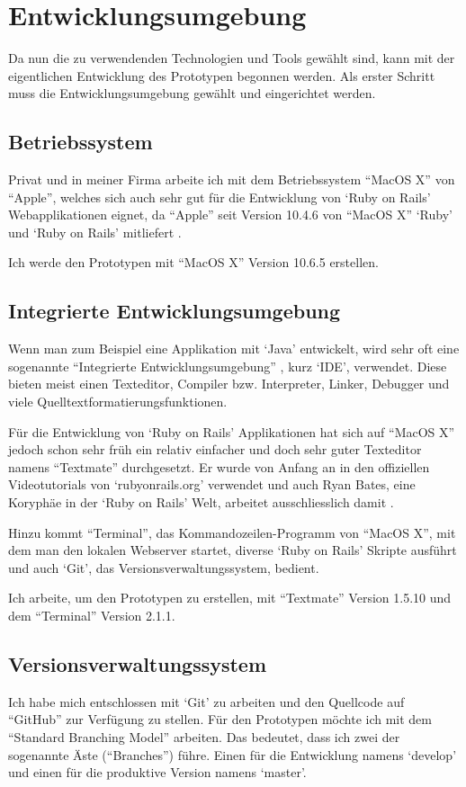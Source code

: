 \section{Entwicklungsumgebung}
Da nun die zu verwendenden Technologien und Tools gewählt sind, kann mit der
eigentlichen Entwicklung des Prototypen begonnen werden. Als erster Schritt
muss die Entwicklungsumgebung gewählt und eingerichtet werden.

\subsection{Betriebssystem}
Privat und in meiner Firma arbeite ich mit dem Betriebssystem ``MacOS X'' von ``Apple'',
welches sich auch sehr gut für die Entwicklung von `Ruby on Rails' Webapplikationen
eignet, da ``Apple'' seit Version 10.4.6 von ``MacOS X'' `Ruby' und `Ruby on Rails' 
mitliefert \cite{macosx}.

Ich werde den Prototypen mit ``MacOS X'' Version 10.6.5 erstellen.

\subsection{Integrierte Entwicklungsumgebung}
Wenn man zum Beispiel eine Applikation mit `Java' entwickelt, wird sehr oft eine
sogenannte ``Integrierte Entwicklungsumgebung'' \cite{ide}, kurz `IDE', verwendet.
Diese bieten meist einen Texteditor, Compiler bzw. Interpreter, Linker, Debugger
und viele Quelltextformatierungsfunktionen.

Für die Entwicklung von `Ruby on Rails' Applikationen hat sich auf ``MacOS X''
jedoch schon sehr früh ein relativ einfacher und doch sehr guter Texteditor
namens ``Textmate'' durchgesetzt. Er wurde von Anfang an in den offiziellen Videotutorials 
von `rubyonrails.org' verwendet und auch Ryan Bates, eine Koryphäe in der
`Ruby on Rails' Welt, arbeitet ausschliesslich damit \cite{ryanbates}. 

Hinzu kommt ``Terminal'', das Kommandozeilen-Programm von ``MacOS X'', mit
dem man den lokalen Webserver startet, diverse `Ruby on Rails' Skripte ausführt
und auch `Git', das Versionsverwaltungssystem, bedient.

Ich arbeite, um den Prototypen zu erstellen, mit ``Textmate'' Version 1.5.10
und dem ``Terminal'' Version 2.1.1.

\subsection{Versionsverwaltungssystem}
Ich habe mich entschlossen mit `Git' zu arbeiten und den Quellcode auf ``GitHub''
zur Verfügung zu stellen. Für den Prototypen möchte ich mit dem 
``Standard Branching Model'' \cite{branching_model} arbeiten. Das bedeutet, dass ich
zwei der sogenannte Äste (``Branches'') führe. Einen für die Entwicklung namens 
`develop' und einen für die produktive Version namens `master'.

